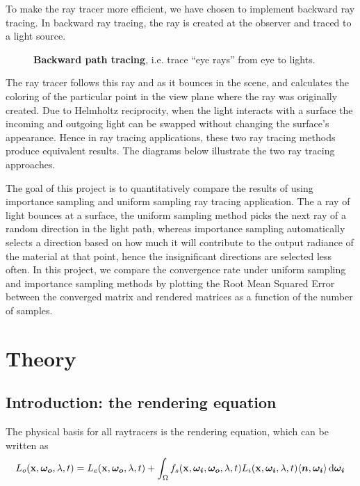 \documentclass[12pt]{article}
\DeclarePairedDelimiter\ip{\langle }{\rangle}
\begin{document}
To make the ray tracer more efficient, we have chosen to implement backward ray tracing.
In backward ray tracing, the ray is created at the observer and traced to a light source.
\begin{figure}[H]
  \centering
  \caption{\textbf{Backward path tracing}, i.e. trace ``eye rays'' from eye to lights.}
\end{figure}
The ray tracer follows this ray and as it bounces in the scene, and calculates the coloring of the particular point in the view plane where the ray was originally created.
Due to Helmholtz reciprocity, when the light interacts with a surface the incoming and outgoing light can be swapped without changing the surface's appearance.
Hence in ray tracing applications, these two ray tracing methods produce equivalent results.
The diagrams below illustrate the two ray tracing approaches.

The goal of this project is to quantitatively compare the results of using importance sampling and uniform sampling ray tracing application.
The a ray of light bounces at a surface, the uniform sampling method picks the next ray of a random direction in the light path, whereas importance sampling automatically selects a direction based on how much it will contribute to the output radiance of the material at that point, hence the insignificant directions are selected less often.
In this project, we compare the convergence rate under uniform sampling and importance sampling methods by plotting the Root Mean Squared Error between the converged matrix and rendered matrices as a function of the number of samples.
    
\section{Theory}
\subsection{Introduction: the rendering equation}
The physical basis for all raytracers is the rendering equation, which can be written as \autocite{kajiya1986rendering}
\[L_{o}(\mathbf x, \bm {\omega_{o}}, \lambda, t) = L_{e}(\mathbf x, \bm{\omega_o}, \lambda, t) + \int_\Omega f_s(\mathbf x, \bm{\omega_i}, \bm{\omega_o}, \lambda, t)L_i(\mathbf x, \bm{\omega_i}, \lambda, t)\ip{\bm n, \bm{\omega_i}} \dif \bm{\omega_i}\]
\end{document}
